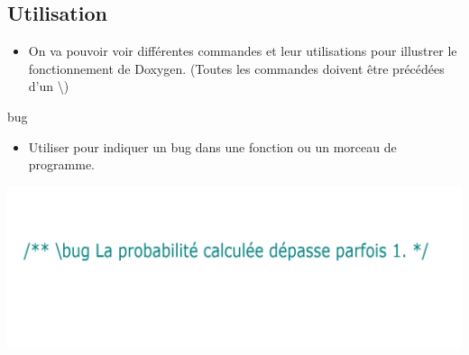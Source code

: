 \documentclass{beamer}
\begin{document}
\subsection{Utilisation}
\begin{frame}{}
 \begin{itemize}
  \item {
   On va pouvoir voir différentes commandes et leur utilisations pour illustrer le fonctionnement de Doxygen.
   (Toutes les commandes doivent être précédées d'un  \backslash  )
  }
\end{itemize}
\end{frame}



\begin{frame}{bug}
\begin{itemize}
  \item {
  Utiliser pour indiquer un bug dans une fonction ou un morceau de programme.
  }
\end{itemize}

\includegraphics[scale=0.20]{Images/m2.png} 

\end{frame}
\end{document}
